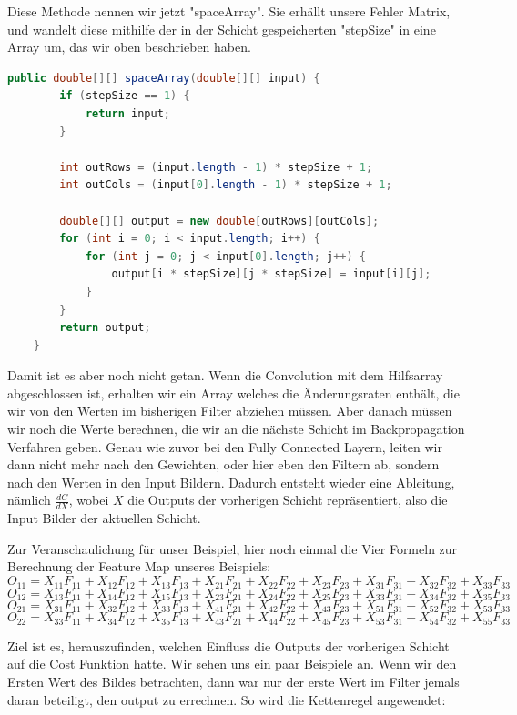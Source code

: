 \documentclass[12pt]{article}
\begin{document}
Diese Methode nennen wir jetzt "spaceArray". Sie erhällt unsere Fehler Matrix, und wandelt diese mithilfe der in der Schicht gespeicherten "stepSize" in eine Array um, das wir oben beschrieben haben.

\begin{lstlisting}[language=Java]
    public double[][] spaceArray(double[][] input) {
        if (stepSize == 1) {
            return input;
        }

        int outRows = (input.length - 1) * stepSize + 1;
        int outCols = (input[0].length - 1) * stepSize + 1;

        double[][] output = new double[outRows][outCols];
        for (int i = 0; i < input.length; i++) {
            for (int j = 0; j < input[0].length; j++) {
                output[i * stepSize][j * stepSize] = input[i][j];
            }
        }
        return output;
    }
\end{lstlisting}

Damit ist es aber noch nicht getan. Wenn die Convolution mit dem Hilfsarray abgeschlossen ist, erhalten wir ein Array welches die Änderungsraten enthält, die wir von den Werten im bisherigen Filter abziehen müssen.
Aber danach müssen wir noch die Werte berechnen, die wir an die nächste Schicht im Backpropagation Verfahren geben. Genau wie zuvor bei den Fully Connected Layern, leiten wir dann nicht mehr nach den Gewichten, oder hier eben den Filtern ab, sondern nach den Werten in den Input Bildern. Dadurch entsteht wieder eine Ableitung, nämlich $\frac {dC} {dX}$, wobei $X$ die Outputs der vorherigen Schicht repräsentiert, also die Input Bilder der aktuellen Schicht.

Zur Veranschaulichung für unser Beispiel, hier noch einmal die Vier Formeln zur Berechnung der Feature Map unseres Beispiels:
$$O_{11} = X_{11}F_{11}+X_{12}F_{12}+X_{13}F_{13}+X_{21}F_{21}+X_{22}F_{22}+X_{23}F_{23}+X_{31}F_{31}+X_{32}F_{32}+X_{33}F_{33}$$
$$O_{12} = X_{13}F_{11}+X_{14}F_{12}+X_{15}F_{13}+X_{23}F_{21}+X_{24}F_{22}+X_{25}F_{23}+X_{33}F_{31}+X_{34}F_{32}+X_{35}F_{33}$$
$$O_{21} = X_{31}F_{11}+X_{32}F_{12}+X_{33}F_{13}+X_{41}F_{21}+X_{42}F_{22}+X_{43}F_{23}+X_{51}F_{31}+X_{52}F_{32}+X_{53}F_{33}$$
$$O_{22} = X_{33}F_{11}+X_{34}F_{12}+X_{35}F_{13}+X_{43}F_{21}+X_{44}F_{22}+X_{45}F_{23}+X_{53}F_{31}+X_{54}F_{32}+X_{55}F_{33}$$

Ziel ist es, herauszufinden, welchen Einfluss die Outputs der vorherigen Schicht auf die Cost Funktion hatte.
Wir sehen uns ein paar Beispiele an. Wenn wir den Ersten Wert des Bildes betrachten, dann war nur der erste Wert im Filter jemals daran beteiligt, den output zu errechnen. So wird die Kettenregel angewendet:
\end{document}
